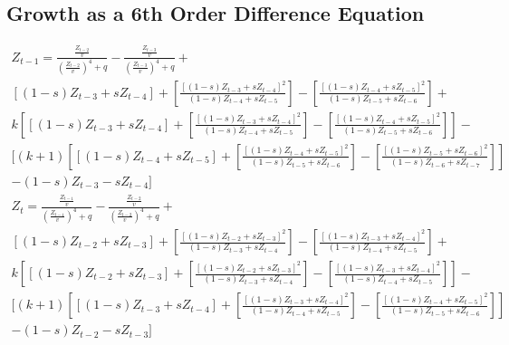 \documentclass[]{article}
\begin{document}
\subsection{Growth as a 6th Order Difference Equation}
	\begin{multline}
		Z_{t-1} = \frac{\frac{Z_{t-2}}{v}}{\left(\frac{Z_{t-2}}{v}\right)^4+q}-\frac{\frac{Z_{t-3}}{v}}{\left(\frac{Z_{t-3}}{v}\right)^4+q}+\\
		[(1-s)Z_{t-3}+sZ_{t-4}]+\left[\frac{[(1-s)Z_{t-3}+sZ_{t-4}]^2}{(1-s)Z_{t-4}+sZ_{t-5}}\right]-\left[\frac{[(1-s)Z_{t-4}+sZ_{t-5}]^2}{(1-s)Z_{t-5}+sZ_{t-6}}\right]+\\
		k\left[[(1-s)Z_{t-3}+sZ_{t-4}]+\left[\frac{[(1-s)Z_{t-3}+sZ_{t-4}]^2}{(1-s)Z_{t-4}+sZ_{t-5}}\right]-\left[\frac{[(1-s)Z_{t-4}+sZ_{t-5}]^2}{(1-s)Z_{t-5}+sZ_{t-6}}\right]\right]-\\
		[(k+1)\left[[(1-s)Z_{t-4}+sZ_{t-5}]+\left[\frac{[(1-s)Z_{t-4}+sZ_{t-5}]^2}{(1-s)Z_{t-5}+sZ_{t-6}}\right]-\left[\frac{[(1-s)Z_{t-5}+sZ_{t-6}]^2}{(1-s)Z_{t-6}+sZ_{t-7}}\right]\right]\\
		-(1-s)Z_{t-3}-sZ_{t-4}]
	\end{multline}
	\begin{multline}
		Z_{t} = \frac{\frac{Z_{t-1}}{v}}{\left(\frac{Z_{t-1}}{v}\right)^4+q}-\frac{\frac{Z_{t-2}}{v}}{\left(\frac{Z_{t-2}}{v}\right)^4+q}+\\
		[(1-s)Z_{t-2}+sZ_{t-3}]+\left[\frac{[(1-s)Z_{t-2}+sZ_{t-3}]^2}{(1-s)Z_{t-3}+sZ_{t-4}}\right]-\left[\frac{[(1-s)Z_{t-3}+sZ_{t-4}]^2}{(1-s)Z_{t-4}+sZ_{t-5}}\right]+\\
		k\left[[(1-s)Z_{t-2}+sZ_{t-3}]+\left[\frac{[(1-s)Z_{t-2}+sZ_{t-3}]^2}{(1-s)Z_{t-3}+sZ_{t-4}}\right]-\left[\frac{[(1-s)Z_{t-3}+sZ_{t-4}]^2}{(1-s)Z_{t-4}+sZ_{t-5}}\right]\right]-\\
		[(k+1)\left[[(1-s)Z_{t-3}+sZ_{t-4}]+\left[\frac{[(1-s)Z_{t-3}+sZ_{t-4}]^2}{(1-s)Z_{t-4}+sZ_{t-5}}\right]-\left[\frac{[(1-s)Z_{t-4}+sZ_{t-5}]^2}{(1-s)Z_{t-5}+sZ_{t-6}}\right]\right]\\
		-(1-s)Z_{t-2}-sZ_{t-3}]
	\end{multline}
\end{document}
